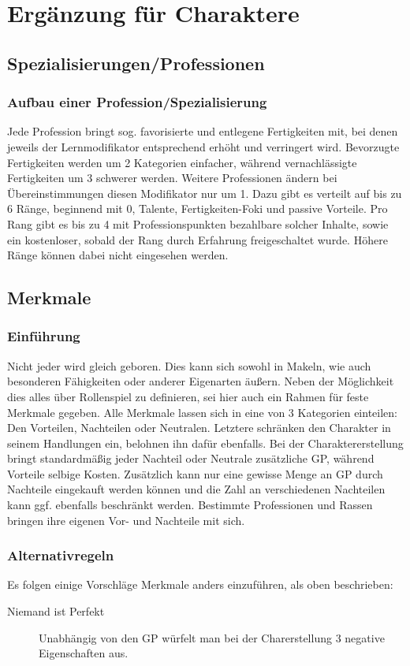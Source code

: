 \documentclass[a4paper,12pt,oneside]{book}
\begin{document}
\part{Ergänzung für Charaktere}
\setcounter{chapter}{0}
\chapter{Spezialisierungen/Professionen}
\section{Aufbau einer Profession/Spezialisierung}
Jede Profession bringt sog. favorisierte und entlegene Fertigkeiten mit, bei denen jeweils der Lernmodifikator entsprechend erhöht und verringert wird. Bevorzugte Fertigkeiten werden um 2 Kategorien einfacher, während vernachlässigte Fertigkeiten um 3 schwerer werden. Weitere Professionen ändern bei Übereinstimmungen diesen Modifikator nur um 1.
Dazu gibt es verteilt auf bis zu 6 Ränge, beginnend mit 0, Talente, Fertigkeiten-Foki und passive Vorteile.
Pro Rang gibt es bis zu 4 mit Professionspunkten bezahlbare solcher Inhalte, sowie ein kostenloser, sobald der Rang durch Erfahrung freigeschaltet wurde. Höhere Ränge können dabei nicht eingesehen werden.  

\chapter{Merkmale}
\section{Einführung}
Nicht jeder wird gleich geboren. Dies kann sich sowohl in Makeln, wie auch besonderen Fähigkeiten oder anderer Eigenarten äußern. Neben der Möglichkeit dies alles über Rollenspiel zu definieren, sei hier auch ein Rahmen für feste Merkmale gegeben. Alle Merkmale lassen sich in eine von 3 Kategorien einteilen: Den Vorteilen, Nachteilen oder Neutralen. Letztere schränken den Charakter in seinem Handlungen ein, belohnen ihn dafür ebenfalls. Bei der Charaktererstellung bringt standardmäßig jeder Nachteil oder Neutrale zusätzliche GP, während Vorteile selbige Kosten. Zusätzlich kann nur eine gewisse Menge an GP durch Nachteile eingekauft werden können und die Zahl an verschiedenen Nachteilen kann ggf. ebenfalls beschränkt werden. Bestimmte Professionen und Rassen bringen ihre eigenen Vor- und Nachteile mit sich.
\section{Alternativregeln}
Es folgen einige Vorschläge Merkmale anders einzuführen, als oben beschrieben:
\begin{description}
\item[Niemand ist Perfekt]Unabhängig von den GP würfelt man bei der Charerstellung 3 negative Eigenschaften aus.
\end{description}
\end{document}
